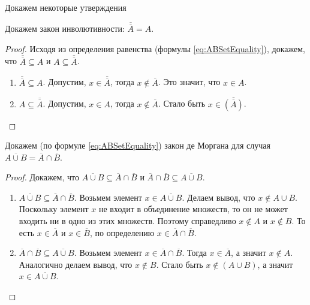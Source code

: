 Докажем некоторые утверждения
\begin{exampl} 
    Докажем закон инволютивности: $\overline{\overline{A}}=A$. 
\end{exampl}
\begin{proof}
    Исходя из определения равенства (формулы \eqref{eq:ABSetEquality}), докажем, что $\overline{\overline{A}}\subseteq A$ и $A\subseteq\overline{\overline{A}}$.
    \begin{enumerate}
        \item $\overline{\overline{A}}\subseteq A$. Допустим, $x\in\overline{\overline{A}}$, тогда $x\not\in\overline{A}$. Это значит, что $x\in A$.
        \item $A\subseteq\overline{\overline{A}}$. Допустим, $x\in A$, тогда $x\not\in\overline{A}$. Стало быть $x\in\overline{(\overline{A})}$.
    \end{enumerate}
\end{proof}

\begin{exampl} 
    Докажем (по формуле \eqref{eq:ABSetEquality}) закон де Моргана для случая $\overline{A\cup B}=\overline{A}\cap\overline{B}$. 
\end{exampl}
\begin{proof}
    Докажем, что $\overline{A\cup B}\subseteq\overline{A}\cap\overline{B}$ и $\overline{A}\cap\overline{B}\subseteq\overline{A\cup B}$.
    \begin{enumerate}
        \item $\overline{A\cup B}\subseteq\overline{A}\cap\overline{B}$. Возьмем элемент $x\in \overline{A\cup B}$. Делаем вывод, что $x\not\in A\cup B$. Поскольку элемент $x$ не входит в объединение множеств, то он не может входить ни в одно из этих множеств. Поэтому справедливо $x\not\in A$ и $x\not\in B$. То есть $x\in\overline{A}$ и $x\in\overline{B}$, по определению $x\in\overline{A}\cap\overline{B}$.
        \item $\overline{A}\cap\overline{B}\subseteq\overline{A\cup B}$. Возьмем элемент $x\in\overline{A}\cap\overline{B}$. Тогда $x\in\overline{A}$, а значит $x\not\in A$. Аналогично делаем вывод, что $x\not\in B$. Стало быть $x\not\in(A\cup B)$, а значит $x\in\overline{A\cup B}$.
    \end{enumerate}
\end{proof}

